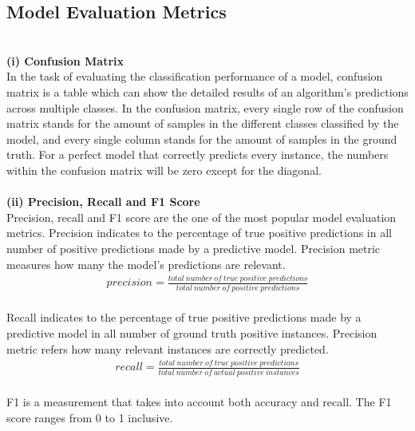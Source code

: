\documentclass[12pt,a4paper]{report}
\begin{document}
\subsection{Model Evaluation Metrics}
\quad\\
\textbf{(i) Confusion Matrix} \\


In the task of evaluating the classification performance of a model, confusion matrix is a table which can show the detailed results of an algorithm's predictions across multiple classes. In the confusion matrix, every single row of the confusion matrix stands for the amount of samples in the different classes classified by the model, and every single column stands for the amount of samples in the ground truth. For a perfect model that correctly predicts every instance, the numbers within the confusion matrix will be zero except for the diagonal.
\\\\
\textbf{(ii) Precision, Recall and F1 Score} \\


Precision, recall and F1 score are the one of the most popular model evaluation metrics. Precision indicates to the percentage of true positive predictions in all number of positive predictions made by a predictive model. Precision metric measures how many the model’s predictions are relevant. 
\\

\begin{gather*}
	    precision = \frac{total \ number \ of \ true \ positive \ predictions}{total \ number \ of \ positive \ predictions}
\end{gather*}\\
	


Recall indicates to the percentage of true positive predictions made by a predictive model in all number of ground truth positive instances. Precision metric refers how many relevant instances are correctly predicted.\\

\begin{gather*}
	    recall = \frac{total \ number \ of \ true \ positive \ predictions}{total \ number \ of \ actual \ positive \ instances}
\end{gather*}\\

F1 is a measurement that takes into account both accuracy and recall. The F1 score ranges from 0 to 1 inclusive.\\
\end{document}
